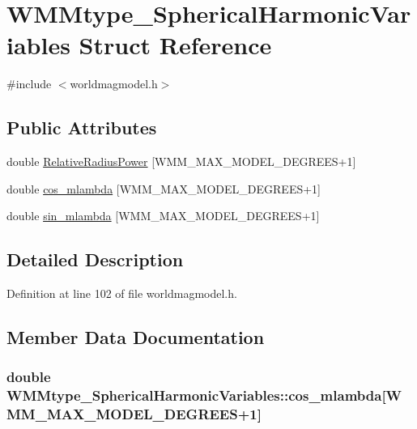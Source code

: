 \hypertarget{struct_w_m_mtype___spherical_harmonic_variables}{\section{\-W\-M\-Mtype\-\_\-\-Spherical\-Harmonic\-Variables \-Struct \-Reference}
\label{struct_w_m_mtype___spherical_harmonic_variables}
}


{\ttfamily \#include $<$worldmagmodel.\-h$>$}

\subsection*{\-Public \-Attributes}
\begin{DoxyCompactItemize}
\item 
double \hyperlink{struct_w_m_mtype___spherical_harmonic_variables_acb306412b3b73ab19d9b2218911de891}{\-Relative\-Radius\-Power} \mbox{[}\-W\-M\-M\-\_\-\-M\-A\-X\-\_\-\-M\-O\-D\-E\-L\-\_\-\-D\-E\-G\-R\-E\-E\-S+1\mbox{]}
\item 
double \hyperlink{struct_w_m_mtype___spherical_harmonic_variables_adf506376126edf63fabf8877e416d52e}{cos\-\_\-mlambda} \mbox{[}\-W\-M\-M\-\_\-\-M\-A\-X\-\_\-\-M\-O\-D\-E\-L\-\_\-\-D\-E\-G\-R\-E\-E\-S+1\mbox{]}
\item 
double \hyperlink{struct_w_m_mtype___spherical_harmonic_variables_af6906ecd2a98bea39e7d43459d7399cb}{sin\-\_\-mlambda} \mbox{[}\-W\-M\-M\-\_\-\-M\-A\-X\-\_\-\-M\-O\-D\-E\-L\-\_\-\-D\-E\-G\-R\-E\-E\-S+1\mbox{]}
\end{DoxyCompactItemize}


\subsection{\-Detailed \-Description}


\-Definition at line 102 of file worldmagmodel.\-h.



\subsection{\-Member \-Data \-Documentation}
\hypertarget{struct_w_m_mtype___spherical_harmonic_variables_adf506376126edf63fabf8877e416d52e}{
\subsubsection[{cos\-\_\-mlambda}]{\setlength{\rightskip}{0pt plus 5cm}double {\bf \-W\-M\-Mtype\-\_\-\-Spherical\-Harmonic\-Variables\-::cos\-\_\-mlambda}\mbox{[}\-W\-M\-M\-\_\-\-M\-A\-X\-\_\-\-M\-O\-D\-E\-L\-\_\-\-D\-E\-G\-R\-E\-E\-S+1\mbox{]}}}\label{struct_w_m_mtype___spherical_harmonic_variables_adf506376126edf63fabf8877e416d52e}


